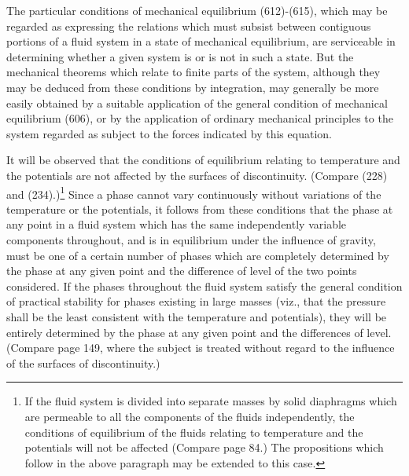 \documentclass[12pt]{memoir}
\begin{document}
The particular conditions of mechanical equilibrium (612)-(615), which may be regarded as expressing the relations which must subsist between contiguous portions of a fluid system in a state of mechanical equilibrium, are serviceable in determining whether a given system is or is not in such a state. But the mechanical theorems which relate to finite parts of the system, although they may be deduced from these conditions by integration, may generally be more easily obtained by a suitable application of the general condition of mechanical equilibrium (606), or by the application of ordinary mechanical principles to the system regarded as subject to the forces indicated by this equation.

It will be observed that the conditions of equilibrium relating to temperature and the potentials are not affected by the surfaces of discontinuity. (Compare (228) and (234).)\footnote{If the fluid system is divided into separate masses by solid diaphragms which are permeable to all the components of the fluids independently, the conditions of equilibrium of the fluids relating to temperature and the potentials will not be affected (Compare page 84.) The propositions which follow in the above paragraph may be extended to this case.} Since a phase cannot vary continuously without variations of the temperature or the potentials, it follows from these conditions that the phase at any point in a fluid system which has the same independently variable components throughout, and is in equilibrium under the influence of gravity, must be one of a certain number of phases which are completely determined by the phase at any given point and the difference of level of the two points considered. If the phases throughout the fluid system satisfy the general condition of practical stability for phases existing in large masses (viz., that the pressure shall be the least consistent with the temperature and potentials), they will be entirely determined by the phase at any given point and the differences of level. (Compare page 149, where the subject is treated without regard to the influence of the surfaces of discontinuity.)
\end{document}
